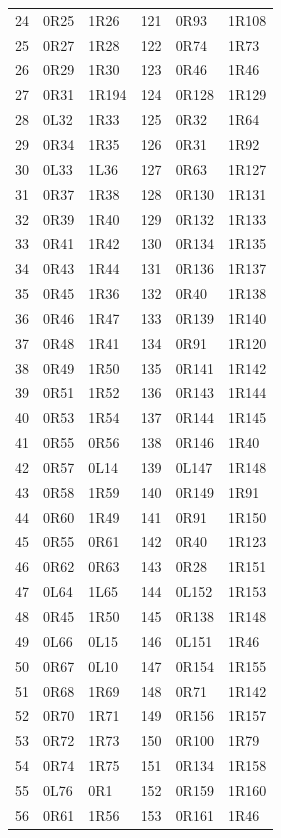 \begin{longtable}{rll@{\qquad}rll}
24 & 0R25 & 1R26 & 121 & 0R93 & 1R108\\
25 & 0R27 & 1R28 & 122 & 0R74 & 1R73\\
26 & 0R29 & 1R30 & 123 & 0R46 & 1R46\\
27 & 0R31 & 1R194 & 124 & 0R128 & 1R129\\
28 & 0L32 & 1R33 & 125 & 0R32 & 1R64\\
29 & 0R34 & 1R35 & 126 & 0R31 & 1R92\\
30 & 0L33 & 1L36 & 127 & 0R63 & 1R127\\
31 & 0R37 & 1R38 & 128 & 0R130 & 1R131\\
32 & 0R39 & 1R40 & 129 & 0R132 & 1R133\\
33 & 0R41 & 1R42 & 130 & 0R134 & 1R135\\
34 & 0R43 & 1R44 & 131 & 0R136 & 1R137\\
35 & 0R45 & 1R36 & 132 & 0R40 & 1R138\\
36 & 0R46 & 1R47 & 133 & 0R139 & 1R140\\
37 & 0R48 & 1R41 & 134 & 0R91 & 1R120\\
38 & 0R49 & 1R50 & 135 & 0R141 & 1R142\\
39 & 0R51 & 1R52 & 136 & 0R143 & 1R144\\
40 & 0R53 & 1R54 & 137 & 0R144 & 1R145\\
41 & 0R55 & 0R56 & 138 & 0R146 & 1R40\\
42 & 0R57 & 0L14 & 139 & 0L147 & 1R148\\
43 & 0R58 & 1R59 & 140 & 0R149 & 1R91\\
44 & 0R60 & 1R49 & 141 & 0R91 & 1R150\\
45 & 0R55 & 0R61 & 142 & 0R40 & 1R123\\
46 & 0R62 & 0R63 & 143 & 0R28 & 1R151\\
47 & 0L64 & 1L65 & 144 & 0L152 & 1R153\\
48 & 0R45 & 1R50 & 145 & 0R138 & 1R148\\
49 & 0L66 & 0L15 & 146 & 0L151 & 1R46\\
50 & 0R67 & 0L10 & 147 & 0R154 & 1R155\\
51 & 0R68 & 1R69 & 148 & 0R71 & 1R142\\
52 & 0R70 & 1R71 & 149 & 0R156 & 1R157\\
53 & 0R72 & 1R73 & 150 & 0R100 & 1R79\\
54 & 0R74 & 1R75 & 151 & 0R134 & 1R158\\
55 & 0L76 & 0R1 & 152 & 0R159 & 1R160\\
56 & 0R61 & 1R56 & 153 & 0R161 & 1R46\\

\end{longtable}
